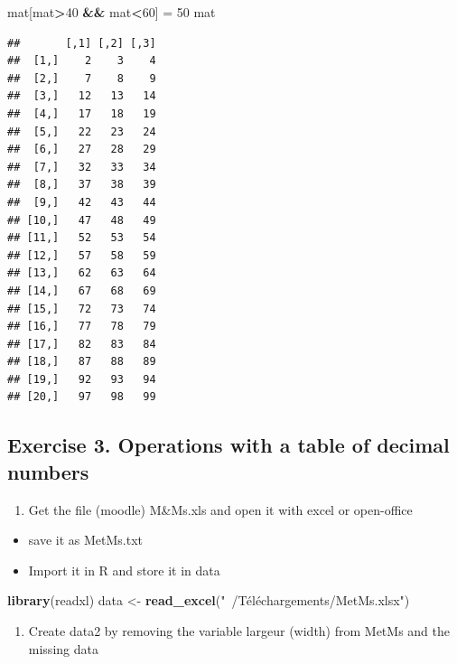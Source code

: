 \documentclass[]{article}
\newenvironment{Shaded}{\begin{snugshade}}{\end{snugshade}}
\newcommand{\KeywordTok}[1]{\textcolor[rgb]{0.13,0.29,0.53}{\textbf{#1}}}
\newcommand{\DecValTok}[1]{\textcolor[rgb]{0.00,0.00,0.81}{#1}}
\newcommand{\StringTok}[1]{\textcolor[rgb]{0.31,0.60,0.02}{#1}}
\newcommand{\OperatorTok}[1]{\textcolor[rgb]{0.81,0.36,0.00}{\textbf{#1}}}
\newcommand{\NormalTok}[1]{#1}
\providecommand{\tightlist}{%
  \setlength{\itemsep}{0pt}\setlength{\parskip}{0pt}}
\begin{document}
\begin{Shaded}
\begin{Highlighting}[]
\NormalTok{mat[mat}\OperatorTok{>}\DecValTok{40} \OperatorTok{&&}\StringTok{ }\NormalTok{mat}\OperatorTok{<}\DecValTok{60}\NormalTok{] =}\StringTok{ }\DecValTok{50}
\NormalTok{mat}
\end{Highlighting}
\end{Shaded}

\begin{verbatim}
##       [,1] [,2] [,3]
##  [1,]    2    3    4
##  [2,]    7    8    9
##  [3,]   12   13   14
##  [4,]   17   18   19
##  [5,]   22   23   24
##  [6,]   27   28   29
##  [7,]   32   33   34
##  [8,]   37   38   39
##  [9,]   42   43   44
## [10,]   47   48   49
## [11,]   52   53   54
## [12,]   57   58   59
## [13,]   62   63   64
## [14,]   67   68   69
## [15,]   72   73   74
## [16,]   77   78   79
## [17,]   82   83   84
## [18,]   87   88   89
## [19,]   92   93   94
## [20,]   97   98   99
\end{verbatim}

\subsection{Exercise 3. Operations with a table of decimal
numbers}\label{exercise-3.-operations-with-a-table-of-decimal-numbers}

\begin{enumerate}
\def\labelenumi{\arabic{enumi}.}
\tightlist
\item
  Get the file (moodle) M\&Ms.xls and open it with excel or open-office
\end{enumerate}

\begin{itemize}
\tightlist
\item
  save it as MetMs.txt
\item
  Import it in R and store it in data
\end{itemize}

\begin{Shaded}
\begin{Highlighting}[]
\KeywordTok{library}\NormalTok{(readxl)}
\NormalTok{data <-}\StringTok{ }\KeywordTok{read_excel}\NormalTok{(}\StringTok{"~/Téléchargements/MetMs.xlsx"}\NormalTok{)}
\end{Highlighting}
\end{Shaded}

\begin{enumerate}
\def\labelenumi{\arabic{enumi}.}
\setcounter{enumi}{1}
\tightlist
\item
  Create data2 by removing the variable largeur (width) from MetMs and
  the missing data
\end{enumerate}
\end{document}
